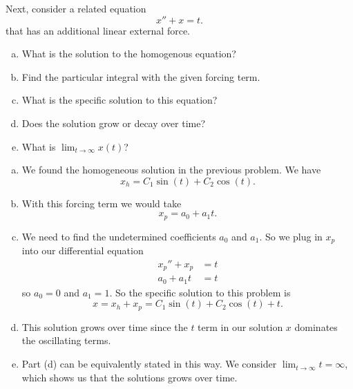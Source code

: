 \documentclass[12pt]{article} %
\begin{document}
\begin{problem}
Next, consider a related equation
\[
x''+x=t.
\]
that has an additional linear external force.
\begin{enumerate}[(a)]
    \item What is the solution to the homogenous equation?
    \item Find the particular integral with the given forcing term.
    \item What is the specific solution to this equation?
    \item Does the solution grow or decay over time?
    \item What is $\lim_{t\to \infty}x(t)$?
\end{enumerate}
\end{problem}
\begin{solution}
\begin{enumerate}[(a)]
    \item We found the homogeneous solution in the previous problem. We have
    \[
    x_h = C_1\sin(t)+C_2\cos(t).
    \]
    \item With this forcing term we would take 
    \[
    x_p = a_0 + a_1t.
    \]
    \item We need to find the undetermined coefficients $a_0$ and $a_1$.  So we plug in $x_p$ into our differential equation
    \begin{align*}
        x_p''+x_p&=t\\
        a_0+a_1t&=t
    \end{align*}
    so $a_0=0$ and $a_1=1$. So the specific solution to this problem is
    \[
    \boxed{x=x_h+x_p=C_1\sin(t)+C_2\cos(t)+t.}
    \]
    \item This solution grows over time since the $t$ term in our solution $x$ dominates the oscillating terms.
    \item Part (d) can be equivalently stated in this way.  We consider $\lim_{t\to \infty} t = \infty$, which shows us that the solutions grows over time.
\end{enumerate}
\end{solution}

\newpage
\end{document}
